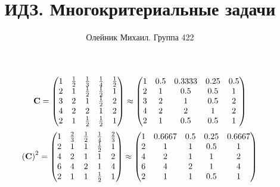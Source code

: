 \documentclass[10pt,a4paper]{article}
\title{ИДЗ. Многокритериальные задачи}
\author{Олейник Михаил. Группа 422}
\begin{document}
	\maketitle
	
	\[
		\bold{C} = 
		\begin{pmatrix}
			{1} {} & \frac{1} {{2}} & \frac{1} {{3}} & \frac{1} {{4}} & \frac{1} {{2}} \\
			{{2}} {} & {1} {} & \frac{1} {{2}} & \frac{1} {{2}} & {1} {} \\
			{{3}} {} & {{2}} {} & {1} {} & \frac{1} {{2}} & {{2}} {} \\
			{{4}} {} & {{2}} {} & {{2}} {} & {1} {} & {{2}} {} \\
			{{2}} {} & {1} {} & \frac{1} {{2}} & \frac{1} {{2}} & {1} {} \\
		\end{pmatrix}
		\approx
		\begin{pmatrix}
			1        & 0.5      & 0.3333   & 0.25     & 0.5      \\
			2        & 1        & 0.5      & 0.5      & 1        \\
			3        & 2        & 1        & 0.5      & 2        \\
			4        & 2        & 2        & 1        & 2        \\
			2        & 1        & 0.5      & 0.5      & 1        \\
		\end{pmatrix}
	\]
	\[
		\left(\bold{C}\right)^{2} = 
		\begin{pmatrix}
			{1} {} & \frac{{2}} {{3}} & \frac{1} {{2}} & \frac{1} {{4}} & \frac{{2}} {{3}} \\
			{{2}} {} & {1} {} & {1} {} & \frac{1} {{2}} & {1} {} \\
			{{4}} {} & {{2}} {} & {1} {} & {1} {} & {{2}} {} \\
			{{6}} {} & {{4}} {} & {{2}} {} & {1} {} & {{4}} {} \\
			{{2}} {} & {1} {} & {1} {} & \frac{1} {{2}} & {1} {} \\
		\end{pmatrix}
		\approx
		\begin{pmatrix}
			1        & 0.6667   & 0.5      & 0.25     & 0.6667   \\
			2        & 1        & 1        & 0.5      & 1        \\
			4        & 2        & 1        & 1        & 2        \\
			6        & 4        & 2        & 1        & 4        \\
			2        & 1        & 1        & 0.5      & 1        \\
		\end{pmatrix}
	\]
\end{document}
